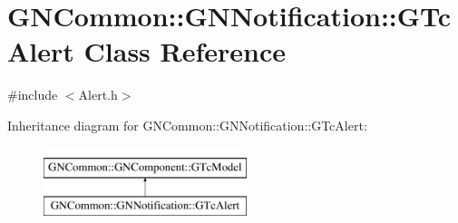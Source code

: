 \hypertarget{class_g_n_common_1_1_g_n_notification_1_1_g_tc_alert}{}\section{G\+N\+Common\+:\+:G\+N\+Notification\+:\+:G\+Tc\+Alert Class Reference}
\label{class_g_n_common_1_1_g_n_notification_1_1_g_tc_alert}


{\ttfamily \#include $<$Alert.\+h$>$}

Inheritance diagram for G\+N\+Common\+:\+:G\+N\+Notification\+:\+:G\+Tc\+Alert\+:\begin{figure}[H]
\begin{center}
\leavevmode
\includegraphics[height=2.000000cm]{class_g_n_common_1_1_g_n_notification_1_1_g_tc_alert}
\end{center}
\end{figure}
